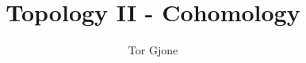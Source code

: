\documentclass[a4paper,11pt,english]{article}
\title{\textbf{Topology II - Cohomology}}
\author{Tor Gjone}
\begin{document}
\mmaketitle

\end{document}
